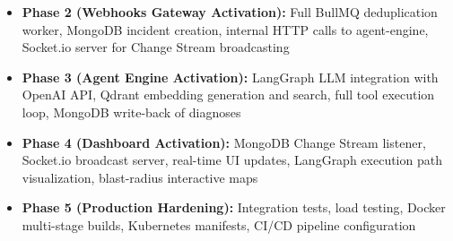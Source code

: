 \documentclass[11pt,a4paper]{article}
\begin{document}
\begin{itemize}[leftmargin=*,itemsep=5pt]
  \item \textbf{Phase 2 (Webhooks Gateway Activation):} Full BullMQ deduplication worker, MongoDB incident creation, internal HTTP calls to agent-engine, Socket.io server for Change Stream broadcasting
  \item \textbf{Phase 3 (Agent Engine Activation):} LangGraph LLM integration with OpenAI API, Qdrant embedding generation and search, full tool execution loop, MongoDB write-back of diagnoses
  \item \textbf{Phase 4 (Dashboard Activation):} MongoDB Change Stream listener, Socket.io broadcast server, real-time UI updates, LangGraph execution path visualization, blast-radius interactive maps
  \item \textbf{Phase 5 (Production Hardening):} Integration tests, load testing, Docker multi-stage builds, Kubernetes manifests, CI/CD pipeline configuration
\end{itemize}

\vspace{16pt}
\begin{center}
\end{center}
\end{document}
